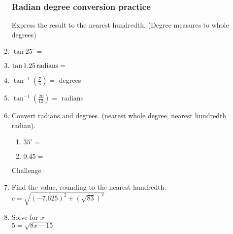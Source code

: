 \begin{enumerate}
\subsubsection*{Radian degree conversion practice}
Express the result to the nearest hundredth. (Degree measures to whole degrees)
  \item $\displaystyle \tan 25^\circ = $ \vspace{1cm}
  \item $\displaystyle \tan 1.25 \,\rm{radians}= $ \vspace{1cm}
  \item $\displaystyle \tan^{-1} (\frac{7}{5}) = $ \hspace{2.4  cm} degrees \vspace{1cm}
  \item $\displaystyle \tan^{-1} (\frac{20}{13}) = $ \hspace{2cm} radians \vspace{1cm}
  \item Convert radians and degrees. (nearest whole degree, nearest hundredth radian).\vspace{.25cm}
  \begin{multicols}{2}
    \begin{enumerate}
      \item $35^\circ = $ \vspace{1cm}
      \item $\displaystyle 0.45 =$ \vspace{1cm}
    \end{enumerate}
  \end{multicols} \vspace{1cm}

Challenge
\item Find the value, rounding to the nearest hundredth.\\[0.25cm]
$c=\sqrt{(-7.625)^2+(\sqrt{83})^2}$
\vspace{2cm}

\item Solve for $x$\\[0.25cm]
 $5=\sqrt{8x-15}$

\end{enumerate}

